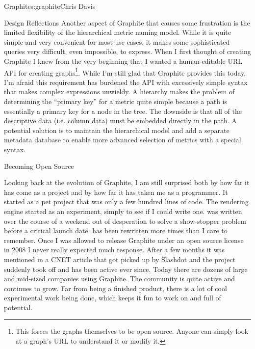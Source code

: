 \begin{aosachapter}{Graphite}{s:graphite}{Chris Davis}
\begin{aosasect1}{Design Reflections}
Another aspect of Graphite that causes some frustration is the limited
flexibility of the hierarchical metric naming model. While it is quite
simple and very convenient for most use cases, it makes some
sophisticated queries very difficult, even impossible, to
express. When I first thought of creating Graphite I knew from the
very beginning that I wanted a human-editable URL API for creating
graphs\footnote{This forces the graphs themselves to be open
source. Anyone can simply look at a graph's URL to understand it or
modify it.}. While I'm still glad that Graphite provides this today,
I'm afraid this requirement has burdened the API with excessively
simple syntax that makes complex expressions unwieldy.  A hierarchy
makes the problem of determining the ``primary key'' for a metric
quite simple because a path is essentially a primary key for a node in
the tree. The downside is that all of the descriptive data (i.e.
column data) must be embedded directly in the path. A potential
solution is to maintain the hierarchical model and add a separate
metadata database to enable more advanced selection of metrics with a
special syntax.

\end{aosasect1}

\begin{aosasect1}{Becoming Open Source}

Looking back at the evolution of Graphite, I am still surprised both by
how far it has come as a project and by how far it has taken me as a
programmer. It started as a pet project that was only a few hundred
lines of code. The rendering engine started as an experiment, simply
to see if I could write one.  was written over the course of a
weekend out of desperation to solve a show-stopper problem before a
critical launch date.  has been rewritten more times than I care
to remember. Once I was allowed to release Graphite under an open
source license in 2008 I never really expected much response. After a
few months it was mentioned in a CNET article that got picked up by
Slashdot and the project suddenly took off and has been active ever
since.  Today there are dozens of large and mid-sized companies using
Graphite. The community is quite active and
continues to grow. Far from being a finished product, there is a lot
of cool experimental work being done, which keeps it fun to work on
and full of potential.

\end{aosasect1}

\end{aosachapter}
